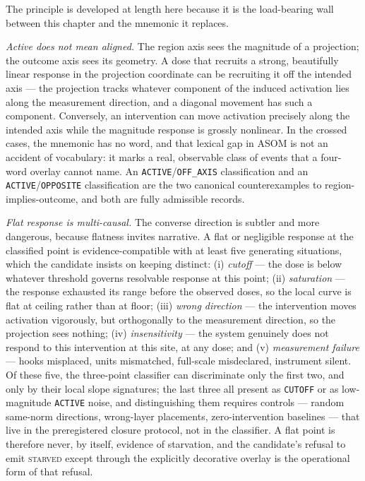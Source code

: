 The principle is developed at length here because it is the load-bearing
wall between this chapter and the mnemonic it replaces.

\emph{Active does not mean aligned.} The region axis sees the magnitude of a
projection; the outcome axis sees its geometry. A dose that recruits a
strong, beautifully linear response in the projection coordinate can be
recruiting it off the intended axis --- the projection tracks whatever
component of the induced activation lies along the measurement direction,
and a diagonal movement has such a component. Conversely, an intervention
can move activation precisely along the intended axis while the magnitude
response is grossly nonlinear. In the crossed cases, the mnemonic has no
word, and that lexical gap in ASOM is not an accident of vocabulary: it
marks a real, observable class of events that a four-word overlay cannot
name. An \texttt{ACTIVE}/\texttt{OFF\_AXIS} classification and an
\texttt{ACTIVE}/\texttt{OPPOSITE} classification are the two canonical
counterexamples to region-implies-outcome, and both are fully admissible
records.

\emph{Flat response is multi-causal.} The converse direction is subtler and
more dangerous, because flatness invites narrative. A flat or negligible
response at the classified point is evidence-compatible with at least five
generating situations, which the candidate insists on keeping distinct:
(i) \emph{cutoff} --- the dose is below whatever threshold governs
resolvable response at this point; (ii) \emph{saturation} --- the response
exhausted its range before the observed doses, so the local curve is flat at
ceiling rather than at floor; (iii) \emph{wrong direction} --- the
intervention moves activation vigorously, but orthogonally to the
measurement direction, so the projection sees nothing; (iv)
\emph{insensitivity} --- the system genuinely does not respond to this
intervention at this site, at any dose; and (v) \emph{measurement failure}
--- hooks misplaced, units mismatched, full-scale misdeclared, instrument
silent. Of these five, the three-point classifier can discriminate only the
first two, and only by their local slope signatures; the last three all
present as \texttt{CUTOFF} or as low-magnitude \texttt{ACTIVE} noise, and
distinguishing them requires controls --- random same-norm directions,
wrong-layer placements, zero-intervention baselines --- that live in the
preregistered closure protocol, not in the classifier. A flat point is
therefore never, by itself, evidence of starvation, and the candidate's
refusal to emit \textsc{starved} except through the explicitly decorative
overlay is the operational form of that refusal.

